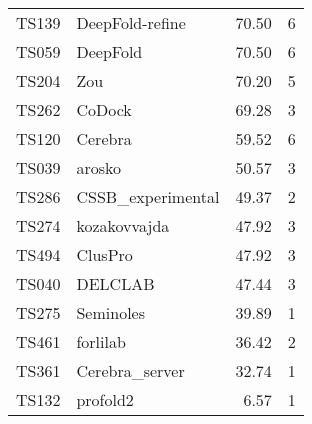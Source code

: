 \begin{table}[ht]
{\begin{tabular}{llrr}
TS139 & DeepFold-refine & 70.50 & 6 \\ 
TS059 & DeepFold & 70.50 & 6 \\ 
TS204 & Zou & 70.20 & 5 \\ 
TS262 & CoDock & 69.28 & 3 \\ 
TS120 & Cerebra & 59.52 & 6 \\ 
TS039 & arosko & 50.57 & 3 \\ 
TS286 & CSSB\_experimental & 49.37 & 2 \\ 
TS274 & kozakovvajda & 47.92 & 3 \\ 
TS494 & ClusPro & 47.92 & 3 \\ 
TS040 & DELCLAB & 47.44 & 3 \\ 
TS275 & Seminoles & 39.89 & 1 \\ 
TS461 & forlilab & 36.42 & 2 \\ 
TS361 & Cerebra\_server & 32.74 & 1 \\ 
TS132 & profold2 & 6.57 & 1 \\ 
\bottomrule
\end{tabular}
}
\end{table}
